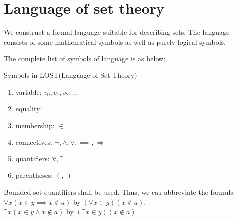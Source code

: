 \section{Language of set theory}

We construct a formal language suitable for describing sets. The language consists of some mathematical symbols as well as purely logical symbols.

The complete list of symbols of language is as below:
\begin{definition}{Symbols in LOST(Language of Set Theory)}{}
    \begin{enumerate}
        \item variable: $v_0, v_1, v_2, \ldots$
        \item equality: $=$
        \item membership: $\in$
        \item connectives: $\neg, \land, \lor, \implies, \iff$
        \item quantifiers: $\forall, \exists$
        \item parentheses: $\left(,\ \right)$
    \end{enumerate}
\end{definition}

\begin{remark}
    Bounded set quantifiers shall be used. Thus, we can abbreviate the formula\\
    $\forall x (x \in y \implies x \notin a)$ by $(\forall x \in y) (x \notin a).$\\
    $\exists x (x \in y \land x \notin a)$ by $(\exists x \in y) (x \notin a).$\\
\end{remark}

